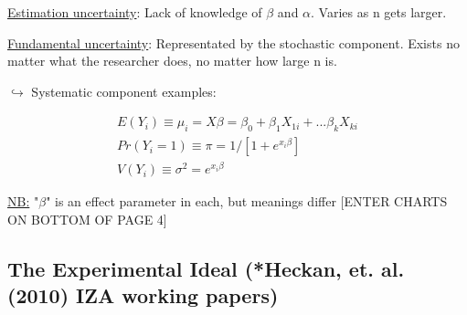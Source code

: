 \noindent *\underline{Estimation uncertainty}: Lack of knowledge of $\beta$ and $\alpha$. Varies as n gets larger.

\vspace{4 mm}

\noindent *\underline{Fundamental uncertainty}: Representated by the stochastic component.  Exists no matter what the researcher does, no matter how large n is.

\vspace{4 mm}

\noindent $\hookrightarrow$ Systematic component examples:

\begin{eqnarray} 
E(Y_{i})\equiv \mu_{i} = X\beta = \beta_{0} + \beta_{1}X_{1i} + ... \beta_{k}X_{ki} \\
Pr(Y_{i}=1) \equiv \pi = 1/[1+e^{x_{i}\beta}] \\
V(Y_{i}) \equiv \sigma^{2} = e^{x_{i}\beta} 
\end{eqnarray}

\noindent \underline{NB:} "$\beta$" is an effect parameter in each, but meanings differ
[ENTER CHARTS ON BOTTOM OF PAGE 4]


\subsection{The Experimental Ideal (*Heckan, et. al. (2010) IZA working papers)}

